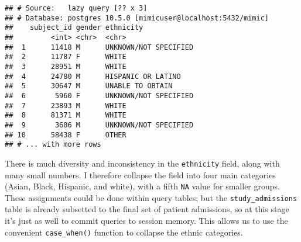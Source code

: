 \documentclass[]{article}
\newenvironment{Shaded}{\begin{snugshade}}{\end{snugshade}}
\newcommand{\KeywordTok}[1]{\textcolor[rgb]{0.13,0.29,0.53}{\textbf{#1}}}
\newcommand{\DataTypeTok}[1]{\textcolor[rgb]{0.13,0.29,0.53}{#1}}
\newcommand{\StringTok}[1]{\textcolor[rgb]{0.31,0.60,0.02}{#1}}
\newcommand{\OperatorTok}[1]{\textcolor[rgb]{0.81,0.36,0.00}{\textbf{#1}}}
\newcommand{\NormalTok}[1]{#1}
\begin{document}
\begin{Shaded}
\end{Shaded}

\begin{verbatim}
## # Source:   lazy query [?? x 3]
## # Database: postgres 10.5.0 [mimicuser@localhost:5432/mimic]
##    subject_id gender ethnicity            
##         <int> <chr>  <chr>                
##  1      11418 M      UNKNOWN/NOT SPECIFIED
##  2      11787 F      WHITE                
##  3      28951 M      WHITE                
##  4      24780 M      HISPANIC OR LATINO   
##  5      30647 M      UNABLE TO OBTAIN     
##  6       5960 F      UNKNOWN/NOT SPECIFIED
##  7      23893 M      WHITE                
##  8      81371 M      WHITE                
##  9       3606 M      UNKNOWN/NOT SPECIFIED
## 10      58438 F      OTHER                
## # ... with more rows
\end{verbatim}

There is much diversity and inconsistency in the \texttt{ethnicity}
field, along with many small numbers. I therefore collapse the field
into four main categories (Asian, Black, Hispanic, and white), with a
fifth \texttt{NA} value for smaller groups. These assignments could be
done within query tables; but the \texttt{study\_admissions} table is
already subsetted to the final set of patient admissions, so at this
stage it's just as well to commit queries to session memory. This allows
us to use the convenient \texttt{case\_when()} function to collapse the
ethnic categories.
\end{document}
